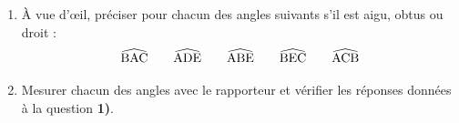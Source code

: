 \documentclass[exercice]{thedocument}%
\begin{document}
%
\begin{enumerate}
    \item À vue d'\oe il, préciser pour chacun des angles suivants s'il est
    aigu, obtus ou droit :
    $$\widehat{\text{BAC}}\hskip20pt\widehat{\text{ADE}}\hskip20pt\widehat{\text{ABE}}
    \hskip20pt\widehat{\text{BEC}}\hskip20pt\widehat{\text{ACB}}
    $$
    \item Mesurer chacun des angles avec le rapporteur et vérifier les
    réponses données à la question {\bfseries 1)}.
\end{enumerate}
\end{document}
